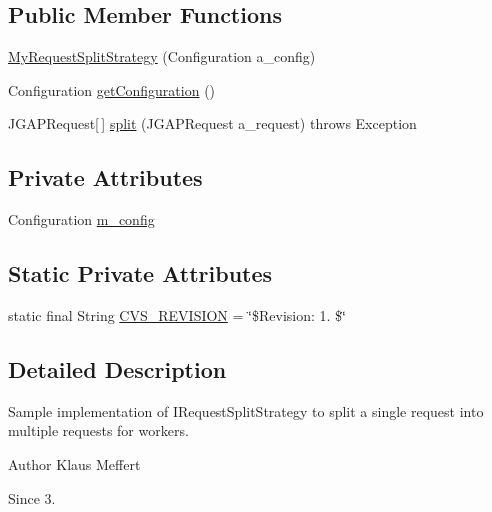 \subsection*{Public Member Functions}
\begin{DoxyCompactItemize}
\item 
\hyperlink{classexamples_1_1grid_1_1evolution_distributed_1_1_my_request_split_strategy_a6532b1820f86e1aa60728c5f5e80b5da}{My\-Request\-Split\-Strategy} (Configuration a\-\_\-config)
\item 
Configuration \hyperlink{classexamples_1_1grid_1_1evolution_distributed_1_1_my_request_split_strategy_a6d42bd8d3f297ac56e6d0e7005a0842c}{get\-Configuration} ()
\item 
J\-G\-A\-P\-Request\mbox{[}$\,$\mbox{]} \hyperlink{classexamples_1_1grid_1_1evolution_distributed_1_1_my_request_split_strategy_a47322c693e0f160e5fc9f9fbf927098d}{split} (J\-G\-A\-P\-Request a\-\_\-request)  throws Exception 
\end{DoxyCompactItemize}
\subsection*{Private Attributes}
\begin{DoxyCompactItemize}
\item 
Configuration \hyperlink{classexamples_1_1grid_1_1evolution_distributed_1_1_my_request_split_strategy_adf60edf08f37e853c63dfaa3c0b6622f}{m\-\_\-config}
\end{DoxyCompactItemize}
\subsection*{Static Private Attributes}
\begin{DoxyCompactItemize}
\item 
static final String \hyperlink{classexamples_1_1grid_1_1evolution_distributed_1_1_my_request_split_strategy_a4539b92a4dbbf06adcff0efa890c7fb9}{C\-V\-S\-\_\-\-R\-E\-V\-I\-S\-I\-O\-N} = \char`\"{}\$Revision\-: 1. \$\char`\"{}
\end{DoxyCompactItemize}


\subsection{Detailed Description}
Sample implementation of I\-Request\-Split\-Strategy to split a single request into multiple requests for workers.

\begin{DoxyAuthor}{Author}
Klaus Meffert 
\end{DoxyAuthor}
\begin{DoxySince}{Since}
3. 
\end{DoxySince}


